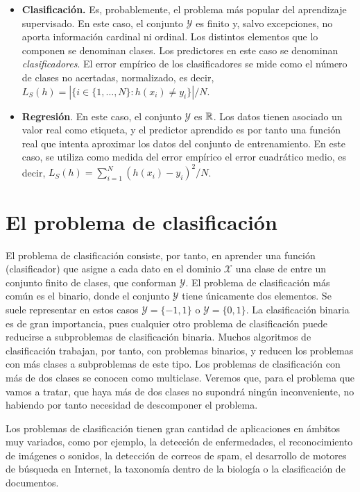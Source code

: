 \begin{itemize}
    \item \textbf{Clasificación.} Es, probablemente, el problema más popular del aprendizaje supervisado. En este caso, el conjunto $\mathcal{Y}$ es finito y, salvo excepciones, no aporta información cardinal ni ordinal. Los distintos elementos que lo componen se denominan clases. Los predictores en este caso se denominan \emph{clasificadores}. El error empírico de los clasificadores se mide como el número de clases no acertadas, normalizado, es decir, $L_S(h) = |\{i \in \{1,\dots,N\} \colon h(x_i) \ne y_i \}|/N$.
    \item \textbf{Regresión}. En este caso, el conjunto $\mathcal{Y}$ es $\mathbb{R}$. Los datos tienen asociado un valor real como etiqueta, y el predictor aprendido es por tanto una función real que intenta aproximar los datos del conjunto de entrenamiento. En este caso, se utiliza como medida del error empírico el error cuadrático medio, es decir, $L_S(h) = \sum_{i=1}^N(h(x_i)-y_i)^2/N$. 
\end{itemize}


\section{El problema de clasificación}

El problema de clasificación consiste, por tanto, en aprender una función (clasificador) que asigne a cada dato en el dominio $\mathcal{X}$ una clase de entre un conjunto finito de clases, que conforman $\mathcal{Y}$. El problema de clasificación más común es el binario, donde el conjunto $\mathcal{Y}$ tiene únicamente dos elementos. Se suele representar en estos casos $\mathcal{Y} = \{-1,1\}$ o $\mathcal{Y} = \{0,1\}$. La clasificación binaria es de gran importancia, pues cualquier otro problema de clasificación puede reducirse a subproblemas de clasificación binaria. Muchos algoritmos de clasificación trabajan, por tanto, con problemas binarios, y reducen los problemas con más clases a subproblemas de este tipo. Los problemas de clasificación con más de dos clases se conocen como multiclase. Veremos que, para el problema que vamos a tratar, que haya más de dos clases no supondrá ningún inconveniente, no habiendo por tanto necesidad de descomponer el problema.

Los problemas de clasificación tienen gran cantidad de aplicaciones en ámbitos muy variados, como por ejemplo, la detección de enfermedades, el reconocimiento de imágenes o sonidos, la detección de correos de spam, el desarrollo de motores de búsqueda en Internet, la taxonomía dentro de la biología o la clasificación de documentos.